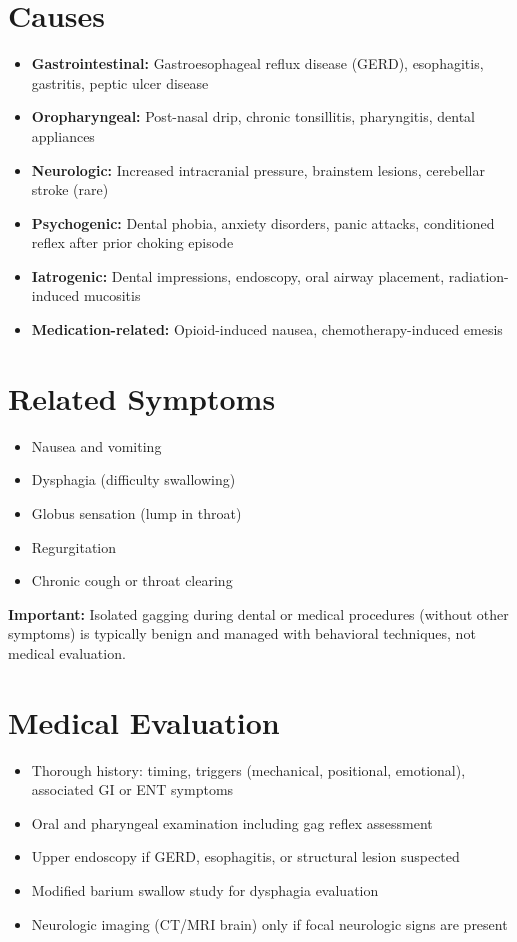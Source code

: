 \section*{Causes}
\begin{itemize}
  \item \textbf{Gastrointestinal:} Gastroesophageal reflux disease (GERD), esophagitis, gastritis, peptic ulcer disease
  \item \textbf{Oropharyngeal:} Post-nasal drip, chronic tonsillitis, pharyngitis, dental appliances
  \item \textbf{Neurologic:} Increased intracranial pressure, brainstem lesions, cerebellar stroke (rare)
  \item \textbf{Psychogenic:} Dental phobia, anxiety disorders, panic attacks, conditioned reflex after prior choking episode
  \item \textbf{Iatrogenic:} Dental impressions, endoscopy, oral airway placement, radiation-induced mucositis
  \item \textbf{Medication-related:} Opioid-induced nausea, chemotherapy-induced emesis
\end{itemize}

\section*{Related Symptoms}
\begin{itemize}
  \item Nausea and vomiting
  \item Dysphagia (difficulty swallowing)
  \item Globus sensation (lump in throat)
  \item Regurgitation
  \item Chronic cough or throat clearing
\end{itemize}
\textbf{Important:} Isolated gagging during dental or medical procedures (without other symptoms) is typically benign and managed with behavioral techniques, not medical evaluation.

\section*{Medical Evaluation}
\begin{itemize}
  \item Thorough history: timing, triggers (mechanical, positional, emotional), associated GI or ENT symptoms
  \item Oral and pharyngeal examination including gag reflex assessment
  \item Upper endoscopy if GERD, esophagitis, or structural lesion suspected
  \item Modified barium swallow study for dysphagia evaluation
  \item Neurologic imaging (CT/MRI brain) only if focal neurologic signs are present
\end{itemize}

